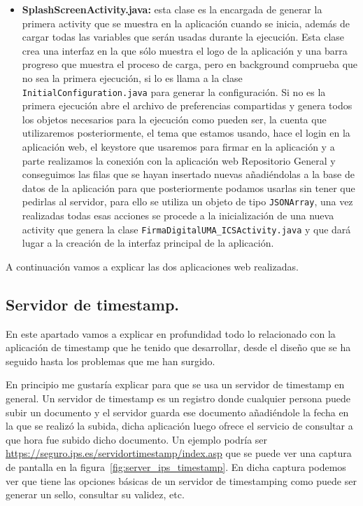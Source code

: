 \begin{itemize}
\item \textbf{SplashScreenActivity.java:} esta clase es la encargada de generar la primera activity que se muestra en la aplicación cuando se inicia, además de cargar todas las variables que serán usadas durante la ejecución. Esta clase crea una interfaz en la que sólo muestra el logo de la aplicación y una barra progreso que muestra el proceso de carga, pero en background comprueba que no sea la primera ejecución, si lo es llama a la clase \lstinline{InitialConfiguration.java} para generar la configuración. Si no es la primera ejecución abre el archivo de preferencias compartidas y genera todos los objetos necesarios para la ejecución como pueden ser, la cuenta que utilizaremos posteriormente, el tema que estamos usando, hace el login en la aplicación web, el keystore que usaremos para firmar en la aplicación y a parte realizamos la conexión con la aplicación web Repositorio General y conseguimos las filas que se hayan insertado nuevas añadiéndolas a la base de datos de la aplicación para que posteriormente podamos usarlas sin tener que pedirlas al servidor, para ello se utiliza un objeto de tipo \lstinline{JSONArray}, una vez realizadas todas esas acciones se procede a la inicialización de una nueva activity que genera la clase \lstinline{FirmaDigitalUMA_ICSActivity.java} y que dará lugar a la creación de la interfaz principal de la aplicación.

\end{itemize}

A continuación vamos a explicar las dos aplicaciones web realizadas.

\subsection{Servidor de timestamp.}

En este apartado vamos a explicar en profundidad todo lo relacionado con la aplicación de timestamp que he tenido que desarrollar, desde el diseño que se ha seguido hasta los problemas que me han surgido.

En principio me gustaría explicar para que se usa un servidor de timestamp en general. Un servidor de timestamp es un registro donde cualquier persona puede subir un documento y el servidor guarda ese documento añadiéndole la fecha en la que se realizó la subida, dicha aplicación luego ofrece el servicio de consultar a que hora fue subido dicho documento. Un ejemplo podría ser \url{https://seguro.ips.es/servidortimestamp/index.asp} que se puede ver una captura de pantalla en la figura~\ref{fig:server_ips_timestamp}. En dicha captura podemos ver que tiene las opciones básicas de un servidor de timestamping como puede ser generar un sello, consultar su validez, etc. 

